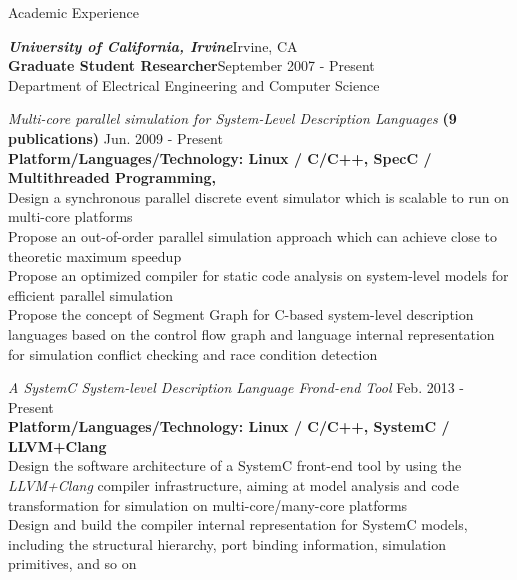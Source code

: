 \documentclass{resume} %
\begin{document}

\begin{rSection}{Academic Experience}


{\large
\emph{\textbf{University of California, Irvine}}\hfill{Irvine, CA}\\
}
\textbf{Graduate Student Researcher}\hfill{September 2007 - Present} \\{Department of Electrical Engineering and Computer Science}
\begin{itemize}
{\small

\item   \textit{Multi-core parallel simulation for System-Level Description Languages} {\bf (9 publications)} \hfill{Jun. 2009 - Present}\\
{\footnotesize {\bf Platform/Languages/Technology: Linux / C/C++, SpecC / Multithreaded Programming, }} \\
Design a synchronous parallel discrete event simulator which is scalable to run on multi-core platforms\\
Propose an out-of-order parallel simulation approach which can achieve close to theoretic maximum speedup \\
Propose an optimized compiler for static code analysis on system-level models for efficient parallel simulation \\
Propose the concept of Segment Graph for C-based system-level description languages based on the control flow graph 
and language internal representation for simulation conflict checking and race condition detection

\item \textit{A SystemC System-level Description Language Frond-end Tool}  \hfill{Feb. 2013 - Present}\\
{\footnotesize  {\bf Platform/Languages/Technology: Linux / C/C++, SystemC / LLVM+Clang}} \\
Design the software architecture of a SystemC front-end tool  by using the \textit{LLVM+Clang} compiler infrastructure, 
aiming at model analysis and code transformation for simulation on multi-core/many-core platforms \\
Design and build the compiler internal representation for SystemC models, including the structural hierarchy, port binding information, simulation primitives, and so on

}
\end{itemize}
\end{rSection}
\end{document}
